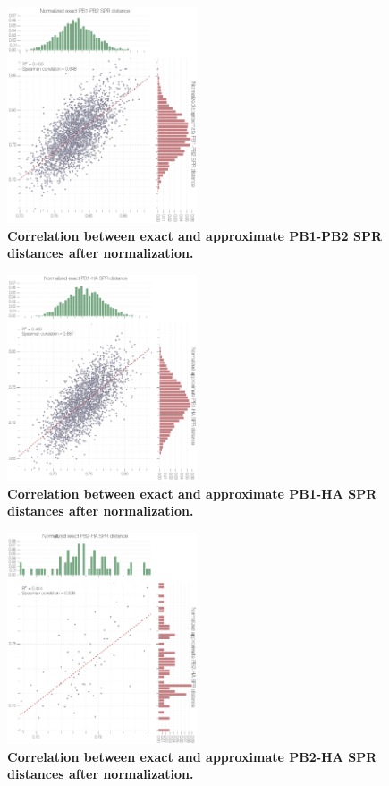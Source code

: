 \documentclass[11pt,oneside,letterpaper]{article}
\begin{document}
\begin{figure}
\centering  
\includegraphics[width=0.5\textwidth]  {supp_figures/InfB_supp_NormPB1-PB2_corr.png}
\caption{\textbf{Correlation between exact and approximate PB1-PB2 SPR distances after normalization.}}
\label{NormSPR_PB1-PB2_correlation}
\end{figure}

\begin{figure}
\centering  
\includegraphics[width=0.5\textwidth]  {supp_figures/InfB_supp_NormPB1-HA_corr.png}
\caption{\textbf{Correlation between exact and approximate PB1-HA SPR distances after normalization.}}
\label{NormSPR_PB1-HA_correlation}
\end{figure}

\begin{figure}
\centering  
\includegraphics[width=0.5\textwidth]  {supp_figures/InfB_supp_NormPB2-HA_corr.png}
\caption{\textbf{Correlation between exact and approximate PB2-HA SPR distances after normalization.}}
\label{NormSPR_PB2-HA_correlation}
\end{figure}
\end{document}
